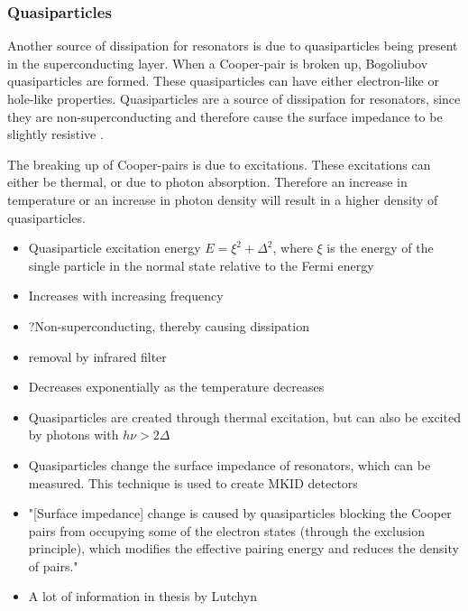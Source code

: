 \documentclass[12pt]{report}
\begin{document}
\subsubsection{Quasiparticles}

Another source of dissipation for resonators is due to quasiparticles being present in the superconducting layer. When a Cooper-pair is broken up, Bogoliubov quasiparticles are formed. These quasiparticles can have either electron-like or hole-like properties. Quasiparticles are a source of dissipation for resonators, since they are non-superconducting and therefore cause the surface impedance to be slightly resistive \cite[p.~18]{Mazin}.

The breaking up of Cooper-pairs is due to excitations. These excitations can either be thermal, or due to photon absorption. Therefore an increase in temperature or an increase in photon density will result in a higher density of quasiparticles.

\begin{itemize}
    \item Quasiparticle excitation energy $E = \xi^2 + \Delta ^2$,
        where $\xi$ is the energy of the single particle in the normal state relative to the Fermi energy \cite{Barends}
    \item Increases with increasing frequency
    \item ?Non-superconducting, thereby causing dissipation
    \item removal by infrared filter
    \item Decreases exponentially as the temperature decreases \cite[p.~19?]{Mazin}
    \item Quasiparticles are created through thermal excitation, but can also be excited by photons with $h \nu > 2 \Delta$\cite{Gao}
    \item Quasiparticles change the surface impedance of resonators, which can be measured.
        This technique is used to create MKID detectors \cite{Gao}
    \item "[Surface impedance] change is caused by quasiparticles blocking
        the Cooper pairs from occupying some of the electron states (through the exclusion principle), which
        modifies the effective pairing energy and reduces the density of pairs."\cite[p.~3]{Mazin}
    \item A lot of information in thesis by Lutchyn \cite{Lutchyn}
\end{itemize}
\end{document}
